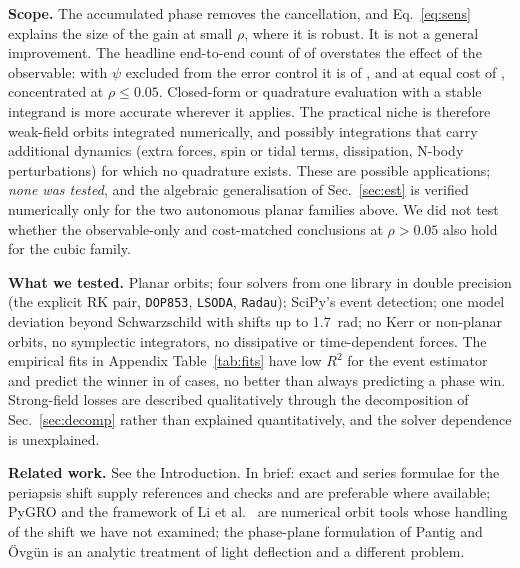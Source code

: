 \documentclass[11pt,a4paper]{article}
\begin{document}
\textbf{Scope.} The accumulated phase removes the cancellation, and Eq.~\eqref{eq:sens} explains the size of the gain at small $\rho$, where it is robust. It is not a general improvement. The headline end-to-end count of \PooledWins{} of \PooledTotal{} overstates the effect of the observable: with $\psi$ excluded from the error control it is \ObsWinsAll{} of \ScN{}, and at equal cost \CmWinsAll{} of \ScN{}, concentrated at $\rho\le0.05$. Closed-form or quadrature evaluation with a stable integrand is more accurate wherever it applies. The practical niche is therefore weak-field orbits integrated numerically, and possibly integrations that carry additional dynamics (extra forces, spin or tidal terms, dissipation, N-body perturbations) for which no quadrature exists. These are possible applications; \emph{none was tested}, and the algebraic generalisation of Sec.~\ref{sec:est} is verified numerically only for the two autonomous planar families above. We did not test whether the observable-only and cost-matched conclusions at $\rho>0.05$ also hold for the cubic family.

\textbf{What we tested.} Planar orbits; four solvers from one library in double precision (the explicit RK pair, \texttt{DOP853}, \texttt{LSODA}, \texttt{Radau}); SciPy's event detection; one model deviation beyond Schwarzschild with shifts up to 1.7~rad; no Kerr or non-planar orbits, no symplectic integrators, no dissipative or time-dependent forces. The empirical fits in Appendix Table~\ref{tab:fits} have low $R^2$ for the event estimator and predict the winner in \ModelCorrect{} of \ModelTotal{} cases, no better than always predicting a phase win. Strong-field losses are described qualitatively through the decomposition of Sec.~\ref{sec:decomp} rather than explained quantitatively, and the solver dependence is unexplained.

\textbf{Related work.} See the Introduction. In brief: exact and series formulae for the periapsis shift \citep{Hall2008,Kraniotis2006,Katsumata2025} supply references and checks and are preferable where available; PyGRO and the framework of Li et al.\ \citep{DellaMonica2025,Li2026} are numerical orbit tools whose handling of the shift we have not examined; the phase-plane formulation of Pantig and \"Ovg\"un \citep{PantigOvgun2026} is an analytic treatment of light deflection and a different problem.
\end{document}
